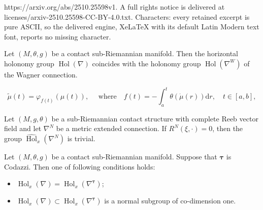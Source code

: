 \documentclass[10pt,a4paper]{amsart}
\newcommand{\Hol}{\operatorname{Hol}}
\newcommand{\bt}{{\boldsymbol{\tau}}}
\renewcommand{\d}{\mathrm{d}}
\begin{document}
https://arxiv.org/abs/2510.25598v1. A full rights notice is delivered at licenses/arxiv-2510.25598-CC-BY-4.0.txt. Characters: every retained excerpt is pure ASCII, so the delivered engine, XeLaTeX with its default Latin Modern text font, reports no missing character.
\begin{theorem}\label{thholW} Let $(M,\theta,g)$ be a contact sub-Riemannian manifold. Then the horizontal holonomy group $\Hol(\nabla)$ coincides with the holonomy group $\Hol(\nabla^W)$ of the Wagner connection. 
\end{theorem}

\begin{equation}\label{deftildmu}
\tilde \mu(t)=\varphi_{f(t)}(\mu(t)),\quad\text{ 
where}\quad f(t)=-\int_a^t\theta(\dot\mu(r))\d r,\quad  t\in[a,b],\end{equation}

\begin{prop}\label{propHhatistrivial} 
Let $(M,g,\theta)$ be a sub-Riemannian contact structure with complete Reeb vector field and let $\nabla^N$ be a metric extended connection.
If $R^N(\xi,\cdot)=0$, then the group $\widehat{\Hol}_x(\nabla^N)$ is trivial.
\end{prop}

\begin{theorem}\label{thHolnabl}
	Let $(M,\theta,g)$ be a contact sub-Riemannian manifold. Suppose that $\bt$ is Codazzi.  Then one of following conditions holds:
	\begin{itemize}
		\item[1.] $\Hol_x(\nabla)=\Hol_x(\nabla^\bt)$;
		\item[2.]  $\Hol_x(\nabla)\subset\Hol_x(\nabla^\bt)$ is a normal subgroup of co-dimension one.
	\end{itemize} 
\end{theorem}
\end{document}
